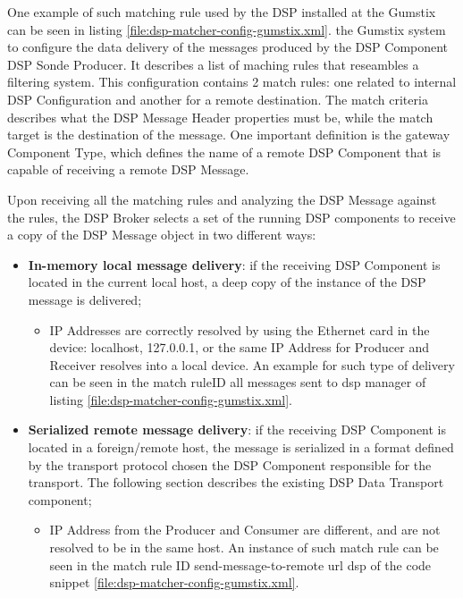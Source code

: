One example of such matching rule used by the DSP installed at the Gumstix can
be seen in listing \ref{file:dsp-matcher-config-gumstix.xml}. the Gumstix
system to configure the data delivery of the messages produced by the DSP
Component DSP Sonde Producer. It describes a list of maching rules that
reseambles a filtering system. This configuration contains 2 match rules: one
related to internal DSP Configuration and another for a remote destination.
The match criteria describes what the DSP Message Header properties must be,
while the match target is the destination of the message. One important
definition is the gateway Component Type, which defines the name of a remote
DSP Component that is capable of receiving a remote DSP Message.

Upon receiving all the matching rules and analyzing the DSP Message against
the rules, the DSP Broker selects a set of the running DSP components to receive
a copy of the DSP Message object in two different ways:

\begin{itemize}
  \item \textbf{In-memory local message delivery}: if the receiving DSP
  Component is located in the current local host, a deep copy of the instance
  of the DSP message is delivered;
    \begin{itemize}[label=\textbullet]
        \item IP Addresses are correctly resolved by using the Ethernet card in
        the device: localhost, 127.0.0.1, or the same IP Address for Producer
        and Receiver resolves into a local device. An example for such type of
        delivery can be seen in the match ruleID
        all messages sent to dsp manager of listing 
        \ref{file:dsp-matcher-config-gumstix.xml}.
    \end{itemize}
  \item \textbf{Serialized remote message delivery}: if the receiving DSP
  Component is located in a foreign/remote host, the message is serialized in a
  format defined by the transport protocol chosen the DSP Component responsible
  for the transport. The following section describes the existing DSP Data
  Transport component;     
  \begin{itemize}[label=\textbullet]
        \item IP Address from the Producer and Consumer are different, and are
        not resolved to be in the same host. An instance of such match rule can
        be seen in the match rule ID send-message-to-remote url dsp of the code
        snippet \ref{file:dsp-matcher-config-gumstix.xml}.
    \end{itemize}
\end{itemize}

